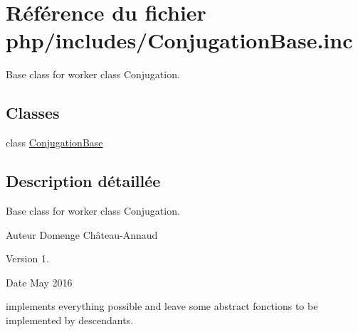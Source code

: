 \hypertarget{_conjugation_base_8inc}{}\section{Référence du fichier php/includes/\+Conjugation\+Base.inc}
\label{_conjugation_base_8inc}


Base class for worker class Conjugation.  


\subsection*{Classes}
\begin{DoxyCompactItemize}
\item 
class \hyperlink{class_conjugation_base}{Conjugation\+Base}
\end{DoxyCompactItemize}


\subsection{Description détaillée}
Base class for worker class Conjugation. 

\begin{DoxyAuthor}{Auteur}
Domenge Château-\/\+Annaud 
\end{DoxyAuthor}
\begin{DoxyVersion}{Version}
1. 
\end{DoxyVersion}
\begin{DoxyDate}{Date}
May 2016
\end{DoxyDate}
implements everything possible and leave some abstract fonctions to be implemented by descendants. 